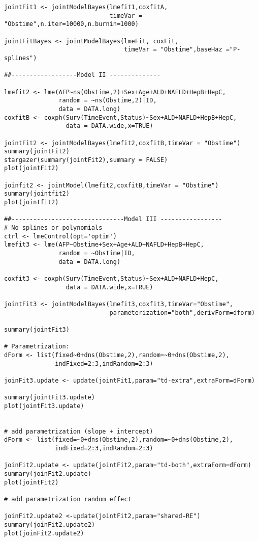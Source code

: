 \documentclass[11pt,twoside]{article}
\numberwithin{Theorem}{section}
\numberwithin{Definition}{section}
\numberwithin{Lemma}{section}
\numberwithin{Algorithm}{section}
\numberwithin{equation}{section}
\begin{document}
\begin{lstlisting}
jointFit1 <- jointModelBayes(lmefit1,coxfitA,
                             timeVar = "Obstime",n.iter=10000,n.burnin=1000)

jointFitBayes <- jointModelBayes(lmeFit, coxFit,
                                 timeVar = "Obstime",baseHaz ="P-splines")

##------------------Model II --------------

lmefit2 <- lme(AFP~ns(Obstime,2)+Sex+Age+ALD+NAFLD+HepB+HepC,
               random = ~ns(Obstime,2)|ID,
               data = DATA.long)
coxfitB <- coxph(Surv(TimeEvent,Status)~Sex+ALD+NAFLD+HepB+HepC,
                 data = DATA.wide,x=TRUE)

jointFit2 <- jointModelBayes(lmefit2,coxfitB,timeVar = "Obstime")
summary(jointFit2)
stargazer(summary(jointFit2),summary = FALSE)
plot(jointFit2)

joinfit2 <- jointModel(lmefit2,coxfitB,timeVar = "Obstime")
summary(jointfit2)
plot(jointfit2)

##-------------------------------Model III -----------------
# No splines or polynomials
ctrl <- lmeControl(opt='optim')
lmefit3 <- lme(AFP~Obstime+Sex+Age+ALD+NAFLD+HepB+HepC,
               random = ~Obstime|ID,
               data = DATA.long)

coxfit3 <- coxph(Surv(TimeEvent,Status)~Sex+ALD+NAFLD+HepC,
                 data = DATA.wide,x=TRUE)

jointFit3 <- jointModelBayes(lmefit3,coxfit3,timeVar="Obstime",
                             parameterization="both",derivForm=dform)

summary(jointFit3)

# Parametrization:
dForm <- list(fixed~0+dns(Obstime,2),random=~0+dns(Obstime,2),
              indFixed=2:3,indRandom=2:3)

joinFit3.update <- update(jointFit1,param="td-extra",extraForm=dForm)

summary(jointFit3.update)
plot(jointFit3.update)


# add parametrization (slope + intercept)
dForm <- list(fixed=~0+dns(Obstime,2),random=~0+dns(Obstime,2),
              indFixed=2:3,indRandom=2:3)

joinFit2.update <- update(jointFit2,param="td-both",extraForm=dForm)
summary(joinFit2.update)
plot(jointFit2)

# add parametrization random effect

joinFit2.update2 <-update(jointFit2,param="shared-RE")
summary(joinFit2.update2)
plot(joinFit2.update2)



\end{lstlisting}
\end{document}
